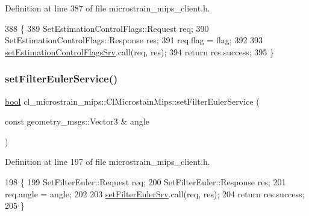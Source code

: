 Definition at line 387 of file microstrain\+\_\+mips\+\_\+client.\+h.


\begin{DoxyCode}
388     \{
389         SetEstimationControlFlags::Request req;
390         SetEstimationControlFlags::Response res;
391         req.flag = flag;
392 
393         \hyperlink{classcl__microstrain__mips_1_1ClMicrostainMips_a2eeff01aea4a41fd5d24ff2f77daf584}{setEstimationControlFlagsSrv}.call(req, res);
394         \textcolor{keywordflow}{return} res.success;
395     \}
\end{DoxyCode}
\mbox{\label{classcl__microstrain__mips_1_1ClMicrostainMips_af5d9e53254b967a2bc02343c2010a47b}} 
\subsubsection{\texorpdfstring{set\+Filter\+Euler\+Service()}{setFilterEulerService()}}
{\footnotesize\ttfamily \hyperlink{classbool}{bool} cl\+\_\+microstrain\+\_\+mips\+::\+Cl\+Microstain\+Mips\+::set\+Filter\+Euler\+Service (\begin{DoxyParamCaption}\item[{const geometry\+\_\+msgs\+::\+Vector3 \&}]{angle }\end{DoxyParamCaption})\hspace{0.3cm}{\ttfamily [inline]}}



Definition at line 197 of file microstrain\+\_\+mips\+\_\+client.\+h.


\begin{DoxyCode}
198     \{
199         SetFilterEuler::Request req;
200         SetFilterEuler::Response res;
201         req.angle = angle;
202 
203         \hyperlink{classcl__microstrain__mips_1_1ClMicrostainMips_a4e88ebd03c7a774e958f8902c18e7f69}{setFilterEulerSrv}.call(req, res);
204         \textcolor{keywordflow}{return} res.success;
205     \}
\end{DoxyCode}
\mbox{\label{classcl__microstrain__mips_1_1ClMicrostainMips_addede8b2d6eac488ff9de6acd0b28fa7}} 
